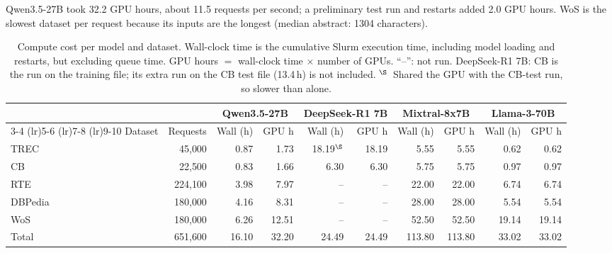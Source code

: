 \par\medskip

Qwen3.5-27B took 32.2 GPU
hours, about 11.5 requests per second; a preliminary test run and restarts
added 2.0 GPU hours. WoS is the slowest dataset per request because its inputs
are the longest (median abstract: 1304 characters).


\begin{table}[H]
  \centering
  \small
  \caption{Compute cost per model and dataset. Wall-clock time is the cumulative Slurm
  execution time, including model loading and restarts, but excluding queue time.
  GPU hours $=$ wall-clock time $\times$ number of GPUs. ``--'': not run.
  DeepSeek-R1 7B: CB is the run on the training file; its extra run on the
  CB test file (13.4\,h) is not included. $^{\S}$~Shared the GPU with the
  CB-test run, so slower than alone.}
  \label{tab:compute}
  \footnotesize
  \setlength{\tabcolsep}{3pt}
  \begin{tabular}{lr rr rr rr rr}
    \toprule
     & & \multicolumn{2}{c}{Qwen3.5-27B} & \multicolumn{2}{c}{DeepSeek-R1 7B} & \multicolumn{2}{c}{Mixtral-8x7B} & \multicolumn{2}{c}{Llama-3-70B} \\
    \cmidrule(lr){3-4} \cmidrule(lr){5-6} \cmidrule(lr){7-8} \cmidrule(lr){9-10}
    Dataset & Requests & Wall (h) & GPU h & Wall (h) & GPU h & Wall (h) & GPU h & Wall (h) & GPU h \\
    \midrule
    TREC    & 45{,}000  & 0.87  & 1.73  & 18.19$^{\S}$ & 18.19 & 5.55  & 5.55  &  0.62  & 0.62 \\
    CB      & 22{,}500  & 0.83  & 1.66  & 6.30  & 6.30  & 5.75  & 5.75  &  0.97  & 0.97 \\
    RTE     & 224{,}100 & 3.98  & 7.97  & --   & --   & 22.00 & 22.00 &  6.74  & 6.74 \\
    DBPedia & 180{,}000 & 4.16  & 8.31  & --   & --   & 28.00 & 28.00 &  5.54  & 5.54 \\
    WoS     & 180{,}000 & 6.26  & 12.51 & --   & --   & 52.50 & 52.50 & 19.14 & 19.14 \\
    \midrule
    Total   & 651{,}600 & 16.10 & 32.20 & 24.49 & 24.49 & 113.80 & 113.80 & 33.02 & 33.02 \\
    \bottomrule
  \end{tabular}
\end{table}



